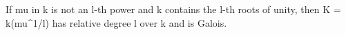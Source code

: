 If mu in k is not an l-th power and k contains the l-th roots of unity, then K = k(mu^{1/l}) has relative degree l over k and is Galois.
